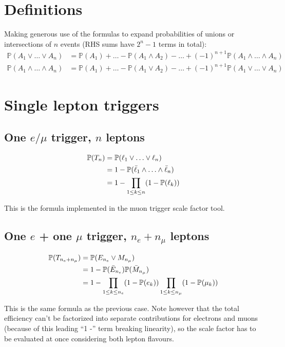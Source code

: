 \documentclass{article}
\newcommand{\pro}{\ensuremath{\mathbb{P}}}
\begin{document}
\section*{Definitions}

Making generous use of the formulas to expand probabilities of unions or intersections of $n$ events 
(RHS sums have $2^n-1$ terms in total):
\begin{align*}
\pro(A_1\vee \ldots \vee A_n)  &= \pro(A_1) + \ldots - \pro(A_1\wedge A_2) - \ldots + (-1)^{n+1} \pro(A_1\wedge\ldots\wedge A_n)\\
\pro(A_1\wedge \ldots \wedge A_n)  &= \pro(A_1) + \ldots - \pro(A_1\vee A_2) - \ldots + (-1)^{n+1} \pro(A_1\vee\ldots\vee A_n)
\end{align*}

\tableofcontents

\section{Single lepton triggers}
\subsection{One $e/\mu$ trigger, $n$ leptons}
\begin{align}
\pro(T_n) & =\pro(\ell_1\vee\ldots\vee\ell_n)\notag\\
&= 1 - \pro(\bar\ell_1\wedge\ldots\wedge\bar\ell_n)\notag\\
&= 1- \prod_{1\leq k\leq n} (1-\pro(\ell_k))
\label{e:1}
\end{align}

This is the formula implemented in the muon trigger scale factor tool. 

\subsection{One $e$ + one $\mu$ trigger, $n_e+n_\mu$ leptons}
\label{s:eOm}

\begin{align}
\pro(T_{n_e+n_\mu})&=\pro(E_{n_e}\vee M_{n_\mu})\notag\\
& =1 - \pro(\bar E_{n_e})\pro(\bar M_{n_\mu})\notag\\
&= 1- \prod_{1\leq k\leq n_e} (1-\pro(e_k))\prod_{1\leq k\leq n_\mu} (1-\pro(\mu_k))
\label{e:eOm}
\end{align}

This is the same formula as the previous case. Note however that the total efficiency can't be factorized into separate contributions for electrons and muons (because of this leading ``1 -'' term breaking linearity), so the scale factor has to be evaluated at once considering both lepton flavours. 
\end{document}
